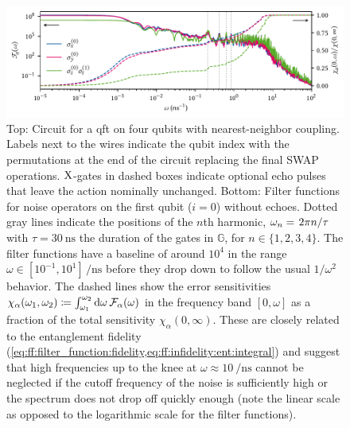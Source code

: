 \begin{figure}
    \centering
    
    \includegraphics{img/pdf/filter_functions/qft_filter_function}
    \caption[
        \protect\newline
    ]{
        Top: Circuit for a \gls{qft} on four qubits with nearest-neighbor coupling.
        Labels next to the wires indicate the qubit index with the permutations at the end of the circuit replacing the final SWAP operations.
        $\mathrm{X}$-gates in dashed boxes indicate optional echo pulses that leave the action nominally unchanged.
        Bottom: Filter functions for noise operators on the first qubit ($i = 0$) without echoes.
        Dotted gray lines indicate the positions of the $n$th harmonic, $\omega_n = \flatfrac{2\pi n}{\tau}$ with $\tau = \qty{30}{\nano\second}$ the duration of the gates in $\mathbb{G}$, for $n\in\lbrace 1, 2, 3, 4\rbrace$.
        The filter functions have a baseline of around $10^4$ in the range $\omega\in[10^{-1}, 10^{1}]\,\unit{\per\nano\second}$ before they drop down to follow the usual $1/\omega^2$ behavior.
        The dashed lines show the error sensitivities $\chi_\alpha(\omega_1,\omega_2)\coloneqq\int_{\omega_1}^{\omega_2}\dd{\omega} \mathcal{F}_\alpha(\omega)$ in the frequency band $[0, \omega]$ as a fraction of the total sensitivity $\chi_\alpha(0,\infty)$.
        These are closely related to the entanglement fidelity (\cf \cref{eq:ff:filter_function:fidelity,eq:ff:infidelity:ent:integral}) and suggest that high frequencies up to the knee at $\omega\approx\qty{10}{\per\nano\second}$ cannot be neglected if the cutoff frequency of the noise is sufficiently high or the spectrum does not drop off quickly enough (note the linear scale as opposed to the logarithmic scale for the filter functions).
    }
    \label{fig:ff:qft}
\end{figure}

